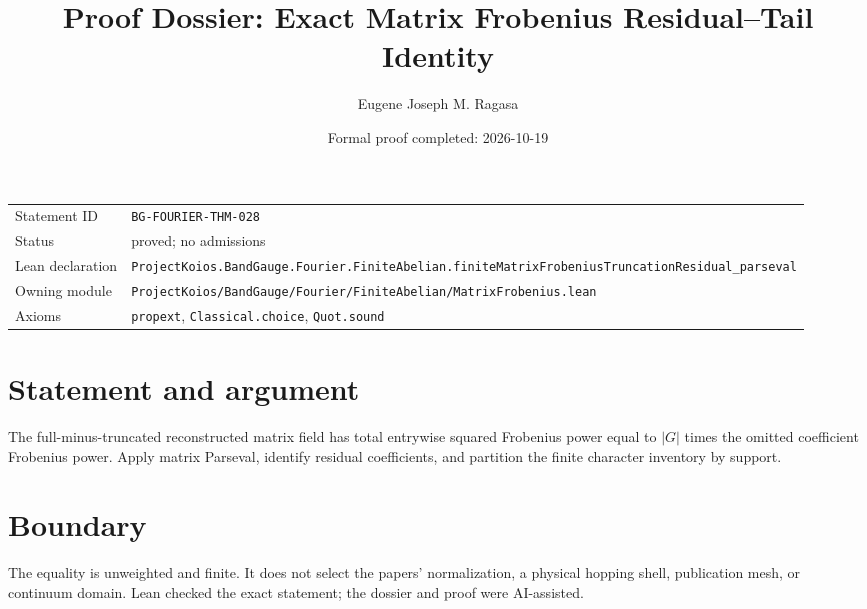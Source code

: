 \documentclass[11pt]{article}
\title{Proof Dossier: Exact Matrix Frobenius Residual--Tail Identity}
\author{Eugene Joseph M. Ragasa}
\date{Formal proof completed: 2026-10-19}
\begin{document}
\maketitle
\noindent\begin{tabularx}{\textwidth}{@{}lX@{}}\toprule
Statement ID & \texttt{BG-FOURIER-THM-028} \\
Status & proved; no admissions \\
Lean declaration & \texttt{ProjectKoios.BandGauge.Fourier.FiniteAbelian.}\newline\texttt{finiteMatrixFrobeniusTruncationResidual\_parseval} \\
Owning module & \texttt{ProjectKoios/BandGauge/Fourier/FiniteAbelian/MatrixFrobenius.lean} \\
Axioms & \texttt{propext}, \texttt{Classical.choice}, \texttt{Quot.sound} \\
\bottomrule\end{tabularx}
\section{Statement and argument}
The full-minus-truncated reconstructed matrix field has total entrywise squared Frobenius power equal to $|G|$ times the omitted coefficient Frobenius power. Apply matrix Parseval, identify residual coefficients, and partition the finite character inventory by support.
\section{Boundary}
The equality is unweighted and finite. It does not select the papers' normalization, a physical hopping shell, publication mesh, or continuum domain. Lean checked the exact statement; the dossier and proof were AI-assisted.
\end{document}
